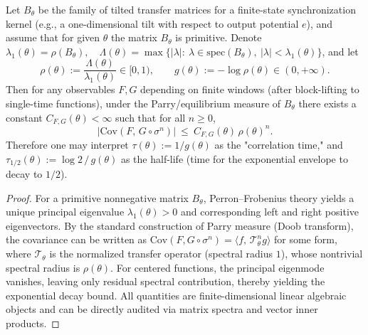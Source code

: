 \begin{proposition}[Spectral Gap \texorpdfstring{$\Rightarrow$}{=>} Exponential Decay of Time Correlation (Auditable)]\label{prop:pom-time-corr-gap}
Let $B_\theta$ be the family of tilted transfer matrices for a finite-state synchronization kernel (e.g., a one-dimensional tilt with respect to output potential $e$), and assume that for given $\theta$ the matrix $B_\theta$ is primitive. Denote
\(
\lambda_1(\theta)=\rho(B_\theta),\quad
\Lambda(\theta)=\max\{ |\lambda|:\ \lambda\in\mathrm{spec}(B_\theta),\ |\lambda|<\lambda_1(\theta)\}
\), and let
\[
\rho(\theta):=\frac{\Lambda(\theta)}{\lambda_1(\theta)}\in[0,1),
\qquad
g(\theta):=-\log \rho(\theta)\in(0,+\infty).
\]
Then for any observables $F,G$ depending on finite windows (after block-lifting to single-time functions), under the Parry/equilibrium measure of $B_\theta$ there exists a constant $C_{F,G}(\theta)<\infty$ such that for all $n\ge 0$,
\[
\bigl|\mathrm{Cov}(F,\,G\circ\sigma^n)\bigr|\ \le\ C_{F,G}(\theta)\,\rho(\theta)^n.
\]
Therefore one may interpret
\(
\tau(\theta):=1/g(\theta)
\)
as the "correlation time," and $\tau_{1/2}(\theta):=\log 2\,/\,g(\theta)$ as the half-life (time for the exponential envelope to decay to $1/2$).
\end{proposition}

\begin{proof}
For a primitive nonnegative matrix $B_\theta$, Perron--Frobenius theory yields a unique principal eigenvalue $\lambda_1(\theta)>0$ and corresponding left and right positive eigenvectors. By the standard construction of Parry measure (Doob transform), the covariance can be written as
\(
\mathrm{Cov}(F,G\circ\sigma^n)=\langle f,\,\mathcal{T}_\theta^n g\rangle
\)
for some form, where $\mathcal{T}_\theta$ is the normalized transfer operator (spectral radius $1$), whose nontrivial spectral radius is $\rho(\theta)$. For centered functions, the principal eigenmode vanishes, leaving only residual spectral contribution, thereby yielding the exponential decay bound. All quantities are finite-dimensional linear algebraic objects and can be directly audited via matrix spectra and vector inner products.
\end{proof}



